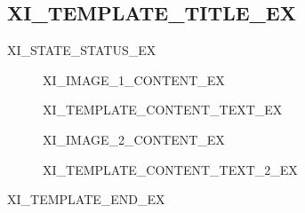 \subsection{XI_TEMPLATE_TITLE_EX}

XI_STATE_STATUS_EX
\begin{figure}[h]
\centering
XI_IMAGE_1_CONTENT_EX
\caption{\label{fig:img1}XI_TEMPLATE_CONTENT_TEXT_EX}
\end{figure}

\vspace{4\baselineskip}

\begin{figure}[h]
\centering
XI_IMAGE_2_CONTENT_EX
\caption{\label{fig:img2}XI_TEMPLATE_CONTENT_TEXT_2_EX}
\end{figure}

\newpage
XI_TEMPLATE_END_EX



